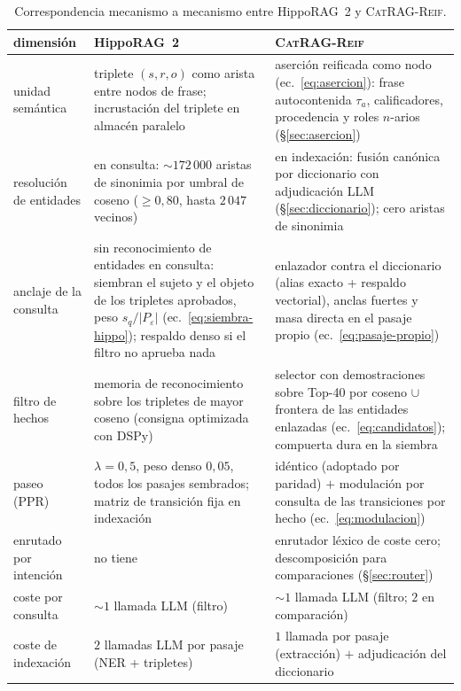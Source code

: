 \documentclass[11pt,a4paper]{article}
\newcommand{\sys}{\textsc{CatRAG-Reif}}          %
\newcommand{\hippo}{HippoRAG~2}
\begin{document}
\begin{table}[t]
\centering\small
\caption{Correspondencia mecanismo a mecanismo entre \hippo{} y \sys{}.}
\label{tab:comparacion}
\begin{tabular}{>{\raggedright\arraybackslash}p{}>{\raggedright\arraybackslash}p{}>{\raggedright\arraybackslash}p{}}
\toprule
dimensión & \hippo{} & \sys{}\\
\midrule
unidad semántica &
triplete $(s,r,o)$ como arista entre nodos de frase; incrustación del
triplete en almacén paralelo &
aserción reificada como nodo (ec.~\ref{eq:asercion}): frase autocontenida
$\tau_a$, calificadores, procedencia y roles $n$-arios
(\S\ref{sec:asercion})\\
\addlinespace
resolución de entidades &
en consulta: $\sim\!172\,000$ aristas de sinonimia por umbral de coseno
($\ge 0{,}80$, hasta $2\,047$ vecinos) &
en indexación: fusión canónica por diccionario con adjudicación LLM
(\S\ref{sec:diccionario}); cero aristas de sinonimia\\
\addlinespace
anclaje de la consulta &
sin reconocimiento de entidades en consulta: siembran el sujeto y el
objeto de los tripletes aprobados, peso $s_q/|P_\varepsilon|$
(ec.~\ref{eq:siembra-hippo}); respaldo denso si el filtro no aprueba nada &
enlazador contra el diccionario (alias exacto + respaldo vectorial),
anclas fuertes y masa directa en el pasaje propio
(ec.~\ref{eq:pasaje-propio})\\
\addlinespace
filtro de hechos &
memoria de reconocimiento sobre los tripletes de mayor coseno (consigna
optimizada con DSPy) &
selector con demostraciones sobre Top-40 por coseno $\cup$ frontera de las
entidades enlazadas (ec.~\ref{eq:candidatos}); compuerta dura en la siembra\\
\addlinespace
paseo (PPR) &
$\lambda=0{,}5$, peso denso $0{,}05$, todos los pasajes sembrados; matriz
de transición fija en indexación &
idéntico (adoptado por paridad) $+$ modulación por consulta de las
transiciones por hecho (ec.~\ref{eq:modulacion})\\
\addlinespace
enrutado por intención &
no tiene &
enrutador léxico de coste cero; descomposición para comparaciones
(\S\ref{sec:router})\\
\addlinespace
coste por consulta &
$\sim\!1$ llamada LLM (filtro) &
$\sim\!1$ llamada LLM (filtro; $2$ en comparación)\\
coste de indexación &
$2$ llamadas LLM por pasaje (NER + tripletes) &
$1$ llamada por pasaje (extracción) $+$ adjudicación del diccionario\\
\bottomrule
\end{tabular}
\end{table}
\end{document}
